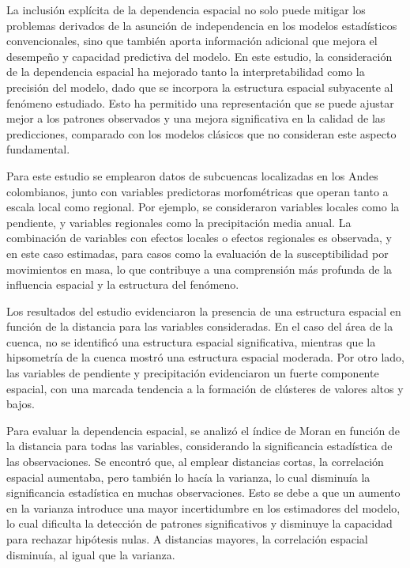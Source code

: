 \documentclass[
  manuscript=article,  
  layout=preprint,  
  year=2023,
  volume=0,
]{format}
\begin{document}
La inclusión explícita de la dependencia espacial no solo puede mitigar los problemas derivados de la asunción de independencia en los modelos estadísticos convencionales, sino que también aporta información adicional que mejora el desempeño y capacidad predictiva del modelo. En este estudio, la consideración de la dependencia espacial ha mejorado tanto la interpretabilidad como la precisión del modelo, dado que se incorpora la estructura espacial subyacente al fenómeno estudiado. Esto ha permitido una representación que se puede ajustar mejor a los patrones observados y una mejora significativa en la calidad de las predicciones, comparado con los modelos clásicos que no consideran este aspecto fundamental.

Para este estudio se emplearon datos de subcuencas localizadas en los Andes colombianos, junto con variables predictoras morfométricas que operan tanto a escala local como regional. Por ejemplo, se consideraron variables locales como la pendiente, y variables regionales como la precipitación media anual. La combinación de variables con efectos locales o efectos regionales es observada, y en este caso estimadas, para casos como la evaluación de la susceptibilidad por movimientos en masa, lo que contribuye a una comprensión más profunda de la influencia espacial y la estructura del fenómeno.

Los resultados del estudio evidenciaron la presencia de una estructura espacial en función de la distancia para las variables consideradas. En el caso del área de la cuenca, no se identificó una estructura espacial significativa, mientras que la hipsometría de la cuenca mostró una estructura espacial moderada. Por otro lado, las variables de pendiente y precipitación evidenciaron un fuerte componente espacial, con una marcada tendencia a la formación de clústeres de valores altos y bajos.

Para evaluar la dependencia espacial, se analizó el índice de Moran en función de la distancia para todas las variables, considerando la significancia estadística de las observaciones. Se encontró que, al emplear distancias cortas, la correlación espacial aumentaba, pero también lo hacía la varianza, lo cual disminuía la significancia estadística en muchas observaciones. Esto se debe a que un aumento en la varianza introduce una mayor incertidumbre en los estimadores del modelo, lo cual dificulta la detección de patrones significativos y disminuye la capacidad para rechazar hipótesis nulas. A distancias mayores, la correlación espacial disminuía, al igual que la varianza.
\end{document}
